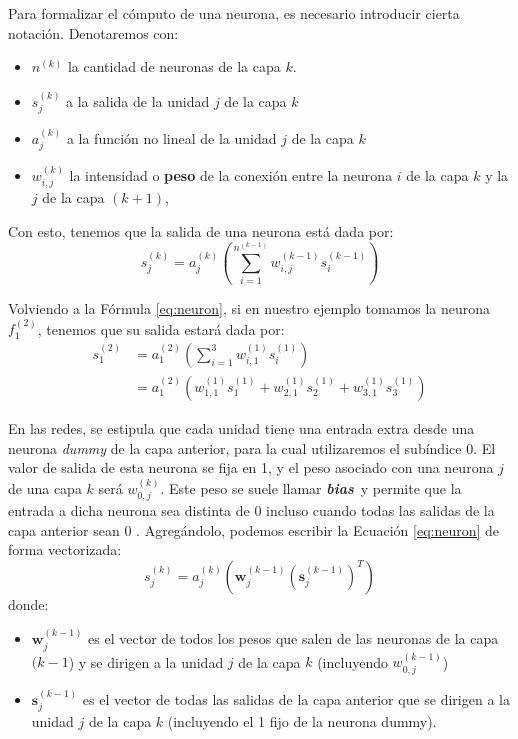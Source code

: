 \documentclass[../../main.tex]{subfiles}
\begin{document}
Para formalizar el cómputo de una neurona, es necesario introducir cierta notación.
Denotaremos con:
\begin{itemize}[itemsep=0.1cm]
    \item \(n^{(k)}\) la cantidad de neuronas de la capa \(k\).
    \item \(s^{(k)}_j\) a la salida de la unidad \(j\) de la capa \(k\)
    \item \(a^{(k)}_j\) a la función no lineal de la unidad \(j\) de la capa \(k\)
    \item \(w^{(k)}_{i,j}\) la intensidad o \textbf{peso} de la conexión entre la
    neurona \(i\) de la capa \(k\) y la \(j\) de la capa \((k+1)\),
\end{itemize}
Con esto, tenemos que la salida de una neurona está dada por:
\begin{equation}
    s^{(k)}_j = a^{(k)}_j \left( \sum_{i=1}^{n^{(k-1)}} w^{(k-1)}_{i,j} s^{(k-1)}_i \right)
    \label{eq:neuron}
\end{equation}

Volviendo a la Fórmula \ref{eq:neuron}, si en nuestro ejemplo tomamos la neurona
\(f^{(2)}_1\), tenemos que su salida estará dada por:
\begin{align*}
    s^{(2)}_1 &= a^{(2)}_1 \left( \sum_{i=1}^{3} w^{(1)}_{i,1} s^{(1)}_i \right) \\
              &= a^{(2)}_1 \left( w^{(1)}_{1,1}s^{(1)}_1 +  w^{(1)}_{2,1}s^{(1)}_2 + w^{(1)}_{3,1}s^{(1)}_3 \right)
\end{align*}

En las redes, se estipula que cada unidad tiene una entrada extra desde una neurona
\textit{dummy} de la capa anterior, para la cual utilizaremos el subíndice 0. El valor de
salida de esta neurona se fija en 1, y el peso asociado con una neurona \(j\) de una capa
\(k\) será \(w^{(k)}_{0,j}\). Este peso se suele llamar
\textit{\textbf{bias}}\footnotemark\ y permite que la entrada a dicha neurona sea distinta
de 0 incluso cuando todas las salidas de la capa anterior sean 0
\cite{ai-a-modern-approach}. Agregándolo, podemos escribir la Ecuación \ref{eq:neuron} de
forma vectorizada:
\begin{equation}
    s^{(k)}_j = a^{(k)}_j \left( \bm{w}^{(k-1)}_j \left( \bm{s}^{(k-1)}_j \right)^T \right)
\end{equation}
donde: \vspace{-0.25cm}
\begin{itemize}
    \item \(\bm{w}^{(k-1)}_j\) es el vector de todos los pesos que salen de las neuronas de la
    capa \((k-1\)) y se dirigen a la unidad \(j\) de la capa \(k\) (incluyendo \(w^{(k-1)}_{0,j}\))
    \item \(\bm{s}^{(k-1)}_j\) es el vector de todas las salidas de la capa anterior que se
dirigen a la unidad \(j\) de la capa \(k\) (incluyendo el 1 fijo de la neurona dummy).
\end{itemize}
\end{document}
